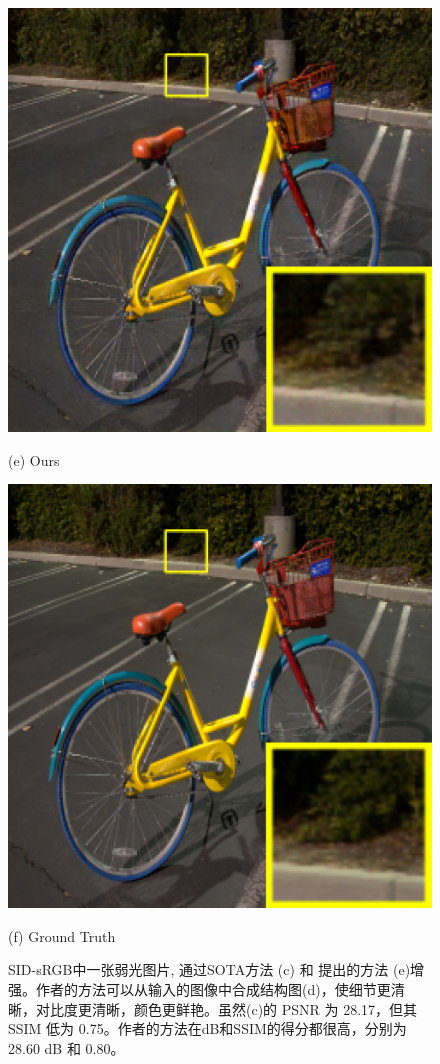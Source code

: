 \documentclass[CJK,aspectratio=169]{beamer}  %
\begin{document}
\begin{frame}
\begin{figure}
\begin{minipage}{.58\columnwidth}
\begin{minipage}{.3\textwidth}
			\end{minipage}
			\begin{minipage}{.3\textwidth}
				\centering
				\includegraphics[width=.8\linewidth]{picture/LLIE/Structure Modeling and Guidance/Ours}
				\caption*{\tiny (e) Ours}
			\end{minipage}
			\begin{minipage}{.3\textwidth}
				\centering
				\includegraphics[width=.8\linewidth]{picture/LLIE/Structure Modeling and Guidance/Ground Truth}
				\caption*{\tiny (f) Ground Truth}
			\end{minipage}
			\caption{
				\tiny SID-sRGB\textcolor{blue}{\citep{chen2018learning}}中一张弱光图片, 通过SOTA方法 (c) 和  \textcolor{blue}{\citep{xu2023low}} 提出的方法 (e)增强。作者的方法可以从输入的图像中合成结构图(d)，使细节更清晰，对比度更清晰，颜色更鲜艳。虽然(c)的 PSNR 为 28.17，但其 SSIM 低为 0.75。作者的方法在dB和SSIM的得分都很高，分别为28.60 dB 和 0.80。
			}
		\end{minipage}
		\end{figure}
		
	\end{frame}
	
\end{document}
